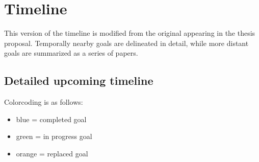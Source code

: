 \documentclass[11pt]{article}
\begin{document}

\section*{Timeline}

This version of the timeline is modified from the original appearing in the thesis proposal. Temporally nearby goals are delineated in detail, while more distant goals are summarized as a series of papers. 

\subsection*{Detailed upcoming timeline}
Colorcoding is as follows:
    
    \begin{itemize}
    	\item {\color{RoyalBlue}blue} = completed goal
    	\item {\color{ForestGreen} green} = in progress goal
    	\item {\color{BurntOrange} orange} = replaced goal
    \end{itemize}
\end{document}
